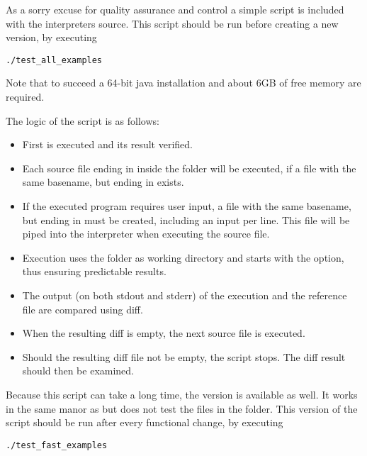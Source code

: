As a sorry excuse for quality assurance and control a simple  script is included with the interpreters source.
This script should be run before creating a new version, by executing

\begin{lstlisting}[frame=none,numbers=none]
./test_all_examples
\end{lstlisting}

Note that to succeed a 64-bit java installation and about 6GB of free memory are required.

The logic of the script is as follows:
\begin{itemize}
	\item First  is executed and its result verified.
	\item Each source file ending in  inside the  folder will be executed, if a file with the same basename, but ending in  exists.
	\item If the executed program requires user input, a file with the same basename, but ending in  must be created, including an input per line. This file will be piped into the interpreter when executing the source file.
	\item Execution uses the  folder as working directory and starts \setlX{} with the  option, thus ensuring predictable results. 
	\item The output (on both stdout and stderr) of the execution and the reference file are compared using diff.
	\item When the resulting diff is empty, the next source file is executed.
	\item Should the resulting diff file not be empty, the script stops. The diff result should then be examined.
\end{itemize}

Because this script can take a long time, the  version is available as well.
It works in the same manor as  but does not test the files in the  folder.
This version of the script should be run after every functional change, by executing

\begin{lstlisting}[frame=none,numbers=none]
./test_fast_examples
\end{lstlisting}

